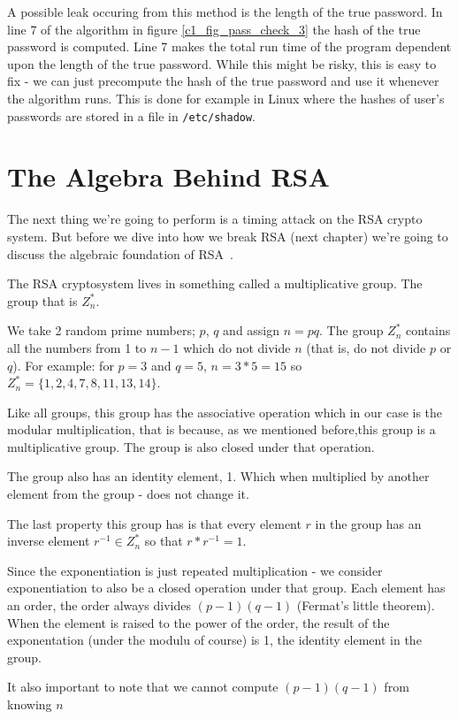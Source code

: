 A possible leak occuring from this method is the length of the true
password. In line 7 of the algorithm in figure \ref{c1_fig_pass_check_3} the
hash of the true password is computed. Line 7 makes the total run time of the
program dependent upon the length of the true password. While this might be risky,
this is easy to fix - we can just precompute the hash of the true password and
use it whenever the algorithm runs. This is done for example in Linux where the
hashes of user's passwords are stored in a file in \lstinline{/etc/shadow}.


\section{The Algebra Behind RSA}
The next thing we're going to perform is a timing attack on the RSA crypto
system. But before we dive into how we break RSA (next chapter) we're going to
discuss the algebraic foundation of RSA~\cite{kaliski2006mathematics}.

The RSA cryptosystem lives in something called a multiplicative group. The group
that is $Z^{*}_n$.

We take 2 random prime numbers; $p$, $q$ and assign $n=pq$. The group
$Z^{*}_n$ contains all the numbers from 1 to $n-1$ which do not divide $n$ (that
is, do not divide $p$ or $q$). For example: for $p=3$ and $q=5$, $n= 3*5 = 15$
so $Z^{*}_n = {\{1,2,4,7,8,11,13,14\}}$.

Like all groups, this group has the associative operation which in our case is
the modular multiplication, that is because, as we mentioned before,this group
is a multiplicative group. The group is also closed under that operation.

The group also has an identity element, 1. Which when multiplied by another
element from the group - does not change it.

The last property this group has is that every element $r$ in the group has an
inverse element $r^{-1} \in Z^{*}_n$ so that $r*r^{-1}=1$.

Since the exponentiation is just repeated multiplication - we consider
exponentiation to also be a closed operation under that group. Each element has
an order, the order always divides $(p-1)(q-1)$ (Fermat's little theorem). When
the element is raised to the power of the order, the result of the exponentation
(under the modulu of course) is 1, the identity element in the group.

It also important to note that we cannot compute $(p-1)(q-1)$ from knowing $n$

